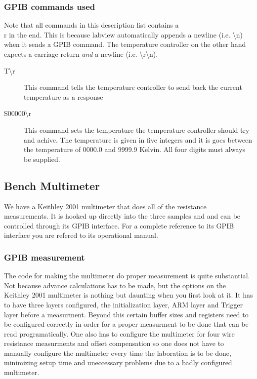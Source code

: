 \documentclass[a4paper,12pt]{article}
\begin{document}
\subsubsection{GPIB commands used}
Note that all commands in this description list contains a \\r in the end. This is because labview automatically appends a newline (i.e. {\textbackslash}n) when it sends a GPIB command. The temperature controller on the other hand expects a carriage return \emph{and} a newline (i.e. {\textbackslash}r{\textbackslash}n).
\begin{description}
\item [T{\textbackslash}r] This command tells the temperature controller to send back the current temperature as a response 
\item [S00000{\textbackslash}r] This command sets the temperature the temperature controller should try and achive. The temperature is given in five integers and it is goes between the temperature of 0000.0 and 9999.9 Kelvin. All four digits must always be supplied. 
\end{description}

\subsection{Bench Multimeter}
We have a Keithley 2001 multimeter that does all of the resistance measurements. It is hooked up directly into the three samples and and can be controlled through its GPIB interface. For a complete reference to its GPIB interface you are refered to its operational manual.

\subsubsection{GPIB measurement}
The code for making the multimeter do proper measurement is quite substantial. Not because advance calculations has to be made, but the options on the Keithley 2001 multimeter is nothing but daunting when you first look at it. It has to have three layers configured, the initialization layer, ARM layer and Trigger layer before a measurment. Beyond this certain buffer sizes and registers need to be configured correctly in order for a proper measurment to be done that can be read programatically. One also has to configure the multimeter for four wire resistance measurments and offset compensation so one does not have to manually configure the multimeter every time the laboration is to be done, minimizing setup time and uneccessary problems due to a badly configured multimeter. 
\end{document}
